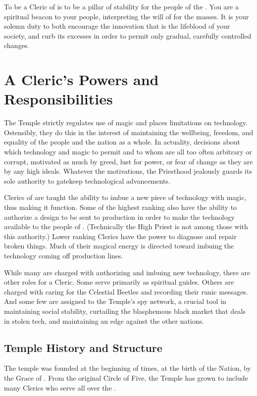 \documentclass[blue]{GL2020}
\begin{document}
\name{\bFPFCleric{}}

To be a Cleric of \cTechGod{} is to be a pillar of stability for the people of the \pTech{}. You are a spiritual beacon to your people, interpreting the will of \cTechGod{} for the masses. It is your solemn duty to both encourage the innovation that is the lifeblood of your society, and curb its excesses in order to permit only gradual, carefully controlled changes.  

\section*{A Cleric's Powers and Responsibilities}
The Temple strictly regulates use of magic and places limitations on technology. Ostensibly, they do this in the interest of maintaining the wellbeing, freedom, and equality of the people and the nation as a whole. In actuality, decisions about which technology and magic to permit and to whom are all too often arbitrary or corrupt, motivated as much by greed, lust for power, or fear of change as they are by any high ideals.  Whatever the motivations, the Priesthood jealously guards its sole authority to gatekeep technological advancements.

Clerics of \cTechGod{} are taught the ability to imbue a new piece of technology with magic, thus making it function. Some of the highest ranking also have the ability to authorize a design to be sent to production in order to make the technology available to the people of \pTech{}. (Technically the High Priest is not among those with this authority.) Lower ranking Clerics have the power to diagnose and repair broken things. Much of their magical energy is directed toward imbuing the technology coming off production lines.

While many are charged with authorizing and imbuing new technology, there are other roles for a Cleric. Some serve primarily as spiritual guides. Others are charged with caring for the Celestial Beetles and recording their runic messages. And some few are assigned to the Temple’s spy network, a crucial tool in maintaining social stability, curtailing the blasphemous black market that deals in stolen tech, and maintaining an edge against the other nations.

\subsection*{Temple History and Structure}
The temple was founded at the beginning of times, at the birth of the Nation, by the Grace of \cTechGod{}. From the original Circle of Five, the Temple has grown to include many Clerics who serve all over the \pTech{}.
\end{document}
